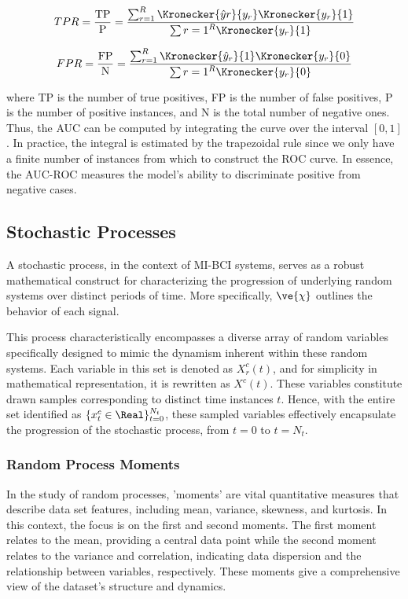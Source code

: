 \begin{equation}
    TPR = \frac{\text{TP}}{\text{P}} = \frac{\sum_{r=1}^{R} \Kronecker{\hat{y}r}{ y_r}\Kronecker{y_r}{1}}{\sum{r=1}^{R} \Kronecker{y_r}{1}}    
\end{equation}

\begin{equation}
    FPR = \frac{\text{FP}}{\text{N}} = \frac{\sum_{r=1}^{R} \Kronecker{\hat{y}_r}{ 1}\Kronecker{y_r}{0}}{\sum{r=1}^{R} \Kronecker{y_r}{0}}
\end{equation}

where TP is the number of true positives, FP is the number of false positives, P is the number of positive instances, and N is the total number of negative ones. Thus, the AUC can be computed by integrating the curve over the interval $[0,1]$. In practice, the integral is estimated by the trapezoidal rule since we only have a finite number of instances from which to construct the ROC curve. In essence, the AUC-ROC measures the model's ability to discriminate positive from negative cases.

\subsection{Stochastic Processes}

A stochastic process, in the context of MI-BCI systems, serves as a robust mathematical construct for characterizing the progression of underlying random systems over distinct periods of time. More specifically, $\ve{\chi}$ outlines the behavior of each signal. 

This process characteristically encompasses a diverse array of random variables specifically designed to mimic the dynamism inherent within these random systems. Each variable in this set is denoted as $X^c_r(t)$, and for simplicity in mathematical representation, it is rewritten as $X^c(t)$. These variables constitute drawn samples corresponding to distinct time instances $t$. Hence, with the entire set identified as $\{{x}^{c}_{t} \in \Real\}_{t=0}^{N_t}$, these sampled variables effectively encapsulate the progression of the stochastic process, from $t=0$ to $t=N_t$.

\subsubsection{Random Process Moments}
 
In the study of random processes, 'moments' are vital quantitative measures that describe data set features, including mean, variance, skewness, and kurtosis. In this context, the focus is on the first and second moments. The first moment relates to the mean, providing a central data point while the second moment relates to the variance and correlation, indicating data dispersion and the relationship between variables, respectively. These moments give a comprehensive view of the dataset's structure and dynamics.

